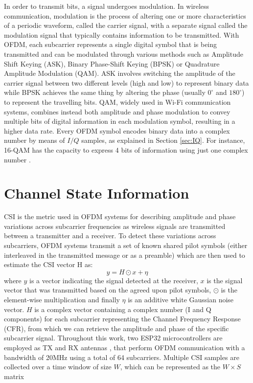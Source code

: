 \documentclass[binding=0.7cm, oneside]{sapthesis}
\begin{document}
In order to transmit bits, a signal undergoes modulation. In wireless communication, modulation is the process of altering one or more characteristics
of a periodic waveform, called the carrier signal, with a separate signal called the modulation signal that typically contains information to be transmitted.
With OFDM, each subcarrier represents a single digital symbol that is being transmitted and can be modulated through various methods \cite{modulations} such
as Amplitude Shift Keying (ASK), Binary Phase-Shift Keying (BPSK) or Quadrature Amplitude Modulation (QAM). ASK involves switching the amplitude of the carrier
signal between two different levels (high and low) to represent binary data while BPSK achieves the same thing by altering the phase (usually $0^\circ$ and $180^\circ$)
to represent the travelling bits. QAM, widely used in Wi-Fi communication systems, combines instead both amplitude and phase modulation to convey multiple bits
of digital information in each modulation symbol, resulting in a higher data rate. Every OFDM symbol encodes binary data into a complex number by means of
$I/Q$ samples, as explained in Section \ref{sec:IQ}. For instance, 16-QAM has the capacity to express 4 bits of information using just one complex number \cite{QAM_explained}.

\section{Channel State Information}
CSI is the metric used in OFDM systems for describing amplitude and phase variations across subcarrier frequencies as wireless signals are transmitted
between a transmitter and a receiver. To detect these variations across subcarriers, OFDM systems transmit a set of known shared pilot symbols
(either interleaved in the transmitted message or as a preamble) which are then used to estimate the CSI vector H as:
$$y = H\odot x + \eta$$
where $y$ is a vector indicating the signal detected at the receiver, $x$ is the signal vector that was transmitted based on
the agreed upon pilot symbols, $\odot$ is the element-wise multiplication and finally $\eta$ is an additive white Gaussian noise vector.
$H$ is a complex vector containing a complex number (I and Q components) for each subcarrier representing the Channel Frequency Response (CFR),
from which we can retrieve the amplitude and phase of the specific subcarrier signal.
Throughout this work, two ESP32 microcontrollers are employed as TX and RX antennas \cite{ESP32_tool}, that perform OFDM communication with a bandwidth of 20MHz
using a total of 64 subcarriers. Multiple CSI samples are collected over a time window of size $W$, which can be represented as the $W\times S$ matrix
\end{document}

